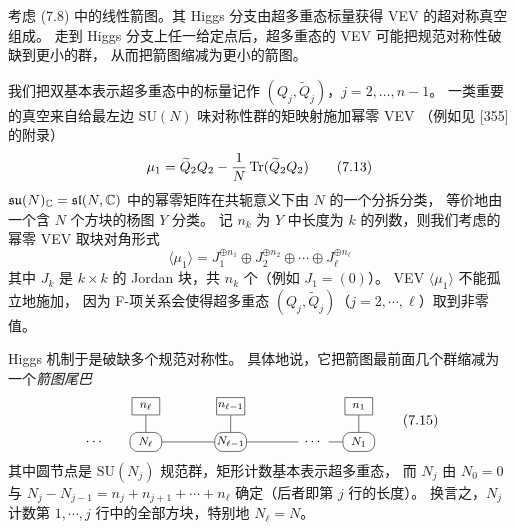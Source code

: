 考虑 (7.8) 中的线性箭图。其 Higgs 分支由超多重态标量获得 VEV 的超对称真空组成。
走到 Higgs 分支上任一给定点后，超多重态的 VEV 可能把规范对称性破缺到更小的群，
从而把箭图缩减为更小的箭图。

我们把双基本表示超多重态中的标量记作 $(Q_j,\widetilde{Q}_j)$，$j=2,\dots,n-1$。
一类重要的真空来自给最左边 $\mathrm{SU}(N)$ 味对称性群的矩映射施加幂零 VEV
（例如见 [355] 的附录）
\begin{equation}
\mu_1=\widetilde{Q}_2Q_2-\frac{1}{N}\operatorname{Tr}(\widetilde{Q}_2Q_2)
\tag{7.13}
\end{equation}
$\mathfrak{su}(N)_{\mathbb{C}}=\mathfrak{sl}(N,\mathbb{C})$ 中的幂零矩阵在共轭意义下由 $N$ 的一个分拆分类，
等价地由一个含 $N$ 个方块的杨图 $Y$ 分类。
记 $n_k$ 为 $Y$ 中长度为 $k$ 的列数，则我们考虑的幂零 VEV 取块对角形式
\begin{equation}
\langle\mu_1\rangle
=J_1^{\oplus n_1}\oplus J_2^{\oplus n_2}\oplus\cdots\oplus J_\ell^{\oplus n_\ell}
\tag{7.14}
\end{equation}
其中 $J_k$ 是 $k\times k$ 的 Jordan 块，共 $n_k$ 个（例如 $J_1=(0)$）。
VEV $\langle\mu_1\rangle$ 不能孤立地施加，
因为 F-项关系会使得超多重态 $(Q_j,\widetilde{Q}_j)$（$j=2,\cdots,\ell$）取到非零值。

Higgs 机制于是破缺多个规范对称性。
具体地说，它把箭图最前面几个群缩减为一个\emph{箭图尾巴}
\begin{equation}
\begin{tikzpicture}[baseline=(current bounding box.center),scale=0.95,
  tnd/.style={draw,rounded corners=2.0mm,minimum height=4.8mm,minimum width=8mm,inner sep=1pt,font=\footnotesize},
  tbx/.style={draw,minimum height=4.4mm,minimum width=7mm,inner sep=1pt,font=\footnotesize}]
\node at (-1.25,0) {$\cdots$};
\node[tnd] (na) at (0.1,0) {$N_\ell$};
\node[tbx] (ba) at (0.1,0.95) {$n_\ell$};
\draw (ba.south) -- (na.north);
\node[tnd] (nb) at (2.35,0) {$N_{\ell-1}$};
\node[tbx] (bb) at (2.35,0.95) {$n_{\ell-1}$};
\draw (bb.south) -- (nb.north);
\draw (na.east) -- (nb.west);
\node[tnd] (nc) at (5.75,0) {$N_1$};
\node[tbx] (bc) at (5.75,0.95) {$n_1$};
\draw (bc.south) -- (nc.north);
\draw (nb.east) -- (4.15,0);
\node at (4.55,0) {$\cdots$};
\draw (4.95,0) -- (nc.west);
\end{tikzpicture}
\tag{7.15}
\end{equation}
其中圆节点是 $\mathrm{SU}(N_j)$ 规范群，矩形计数基本表示超多重态，
而 $N_j$ 由 $N_0=0$ 与 $N_j-N_{j-1}=n_j+n_{j+1}+\cdots+n_\ell$ 确定（后者即第 $j$ 行的长度）。
换言之，$N_j$ 计数第 $1,\cdots,j$ 行中的全部方块，特别地 $N_\ell=N$。


